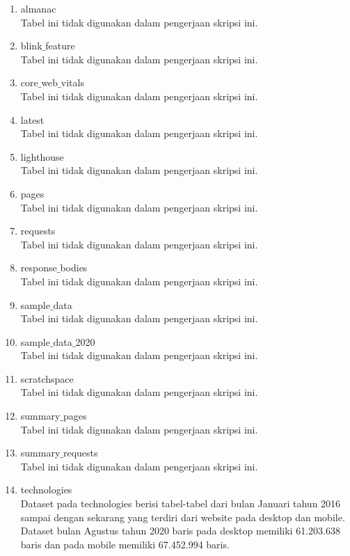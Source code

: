 \begin{enumerate}
	\item almanac\\
	Tabel ini tidak digunakan dalam pengerjaan skripsi ini.
	\item blink$\_$feature\\
	Tabel ini tidak digunakan dalam pengerjaan skripsi ini.
	\item core$\_$web$\_$vitals\\
	Tabel ini tidak digunakan dalam pengerjaan skripsi ini.
	\item latest\\
	Tabel ini tidak digunakan dalam pengerjaan skripsi ini.
	\item lighthouse\\
	Tabel ini tidak digunakan dalam pengerjaan skripsi ini.
	\item pages\\
	Tabel ini tidak digunakan dalam pengerjaan skripsi ini.
	\item requests\\
	Tabel ini tidak digunakan dalam pengerjaan skripsi ini.
	\item response$\_$bodies\\
	Tabel ini tidak digunakan dalam pengerjaan skripsi ini.
	\item sample$\_$data\\
	Tabel ini tidak digunakan dalam pengerjaan skripsi ini.
	\item sample$\_$data$\_$2020\\
	Tabel ini tidak digunakan dalam pengerjaan skripsi ini.
	\item scratchspace\\
	Tabel ini tidak digunakan dalam pengerjaan skripsi ini.
	\item summary$\_$pages\\
	Tabel ini tidak digunakan dalam pengerjaan skripsi ini.
	\item summary$\_$requests\\
	Tabel ini tidak digunakan dalam pengerjaan skripsi ini.
	\item technologies\\
	Dataset pada technologies berisi tabel-tabel dari bulan Januari tahun 2016 sampai dengan sekarang yang terdiri dari website pada desktop dan mobile. Dataset bulan Agustus tahun 2020 baris pada desktop memiliki 61.203.638 baris 
	 dan pada mobile memiliki 67.452.994 baris. 

\end{enumerate}
